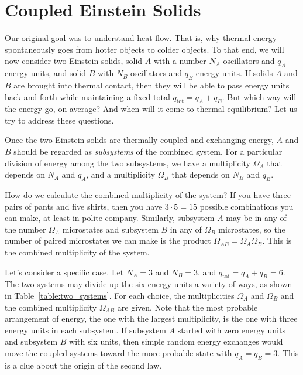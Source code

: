 \section{Coupled Einstein Solids}

Our original goal was to understand heat flow.  That is, why thermal
energy spontaneously goes from hotter objects to colder objects.  To
that end, we will now consider two Einstein solids, solid $A$ with a
number $N_A$ oscillators and $q_A$ energy units, and solid $B$ with
$N_B$ oscillators and $q_B$ energy units.  If solids $A$ and $B$ are
brought into thermal contact, then they will be able to pass energy
units back and forth while maintaining a fixed total
$q_\text{tot}=q_A+q_B$.  But which way will the energy go, on average?  And
when will it come to thermal equilibrium?  Let us try to address these
questions. 

Once the two Einstein solids are thermally coupled and exchanging
energy, $A$ and $B$ should be regarded as {\it subsystems} of the
combined system.  For a particular division of energy among the two
subsystems, we have a multiplicity $\Omega_A$ that depends on $N_A$
and $q_A$, and a multiplicity $\Omega_B$ that depends on $N_B$ and
$q_B$.  

How do we calculate the combined multiplicity of the system?  If you
have three pairs of pants and five shirts, then you have $3\cdot 5=15$
possible combinations you can make, at least in polite company.
Similarly, subsystem $A$ may be in any of the number $\Omega_A$
microstates and subsystem $B$ in any of $\Omega_B$ microstates, so the
number of paired microstates we can make is the product $\Omega_{AB} =
\Omega_A\Omega_B$.  This is the combined multiplicity of the system.

Let's consider a specific case.  Let $N_A=3$ and $N_B=3$, and
$q_\text{tot}=q_A+q_B=6$.  The two systems may divide up the six energy
units a variety of ways, as shown in Table~\ref{table:two_systems}.
For each choice, the multiplicities $\Omega_A$ and $\Omega_B$ and the
combined multiplicity $\Omega_{AB}$ are given.  Note that the most
probable arrangement of energy, the one with the largest multiplicity,
is the one with three energy units in each subsystem.  If subsystem
$A$ started with zero energy units and subsystem $B$ with six units,
then simple random energy exchanges would move the coupled systems
toward the more probable state with $q_A=q_B=3$.  This is a clue about the
origin of the second law.

